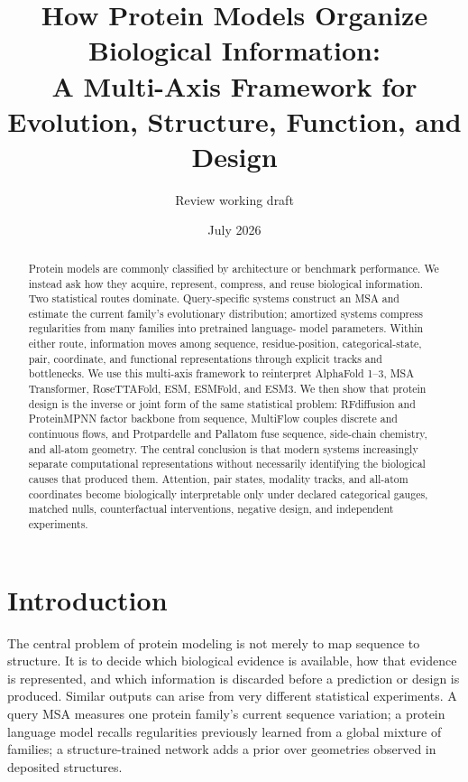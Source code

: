 \documentclass[10pt]{article}
\title{How Protein Models Organize Biological Information:\\
A Multi-Axis Framework for Evolution, Structure, Function, and Design}
\author{Review working draft}
\date{July 2026}
\begin{document}
\maketitle

\begin{abstract}
Protein models are commonly classified by architecture or benchmark performance.  We instead ask
how they acquire, represent, compress, and reuse biological information.  Two statistical routes
dominate.  Query-specific systems construct an MSA and estimate the current family's evolutionary
distribution; amortized systems compress regularities from many families into pretrained language-
model parameters.  Within either route, information moves among sequence, residue-position,
categorical-state, pair, coordinate, and functional representations through explicit tracks and
bottlenecks.  We use this multi-axis framework to reinterpret AlphaFold 1--3, MSA Transformer,
RoseTTAFold, ESM, ESMFold, and ESM3.  We then show that protein design is the inverse or joint form
of the same statistical problem: RFdiffusion and ProteinMPNN factor backbone from sequence,
MultiFlow couples discrete and continuous flows, and Protpardelle and Pallatom fuse sequence,
side-chain chemistry, and all-atom geometry.  The central conclusion is that modern systems
increasingly separate computational representations without necessarily identifying the biological
causes that produced them.  Attention, pair states, modality tracks, and all-atom coordinates become
biologically interpretable only under declared categorical gauges, matched nulls, counterfactual
interventions, negative design, and independent experiments.
\end{abstract}

\section{Introduction}

The central problem of protein modeling is not merely to map sequence to structure.  It is to decide
which biological evidence is available, how that evidence is represented, and which information is
discarded before a prediction or design is produced.  Similar outputs can arise from very different
statistical experiments.  A query MSA measures one protein family's current sequence variation;
a protein language model recalls regularities previously learned from a global mixture of families;
a structure-trained network adds a prior over geometries observed in deposited structures.
\end{document}
